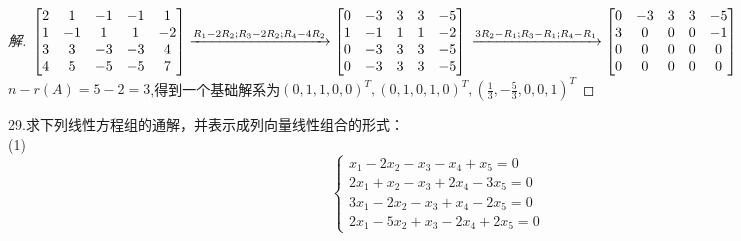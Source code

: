 \documentclass[10pt,a4paper]{report}
\begin{document}
\begin{proof}[解]
	$
	\left[
	\begin{matrix}
	2 & 1 & -1 & -1 & 1 \\
	1 & -1 & 1 & 1 & -2\\
	3 & 3 & -3 & -3 & 4\\
	4 & 5 & -5 & -5 & 7
	\end{matrix}
	\right] 
	\xrightarrow{R_{1}-2R_{2};R_{3}-2R_{2};R_{4}-4R_{2}}
	\left[
	\begin{matrix}
	0 & -3 & 3 & 3 & -5 \\
	1 & -1 & 1 & 1 & -2\\
	0 & -3 & 3 & 3 & -5\\
	0 & -3 & 3 & 3 & -5
	\end{matrix}
	\right] \\
	\xrightarrow{3R_{2}-R_{1};R_{3}-R_{1};R_{4}-R_{1}}
	\left[
	\begin{matrix}
	0 & -3 & 3 & 3 & -5 \\
	3 & 0 & 0 & 0 & -1\\
	0 & 0 & 0 & 0 & 0\\
	0 & 0 & 0 & 0 & 0
	\end{matrix}
	\right]
	$\\
	$n-r(A)=5-2=3$,得到一个基础解系为$(0,1,1,0,0)^{T},(0,1,0,1,0)^{T},(\frac{1}{3},-\frac{5}{3},0,0,1)^{T}$
\end{proof}
\noindent 29.求下列线性方程组的通解，并表示成列向量线性组合的形式：\\
\noindent (1)
$$
\left\{
\begin{aligned}
x_{1}-2x_{2}-x_{3}-x_{4}+x_{5}=0 \\
2x_{1}+x_{2}-x_{3}+2x_{4}-3x_{5}=0 \\
3x_{1}-2x_{2}-x_{3}+x_{4}-2x_{5}=0 \\
2x_{1}-5x_{2}+x_{3}-2x_{4}+2x_{5}=0
\end{aligned}
\right.
$$
\end{document}
